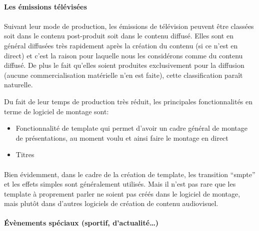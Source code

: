\paragraph {Les émissions télévisées}

\paragraph{}

Suivant leur mode de production, les émissions de télévision peuvent
être classées soit dans le contenu post-produit soit dans le contenu
diffusé. Elles sont en général diffusées très rapidement après la
création du contenu (si ce n'est en direct) et c'est la raison pour
laquelle nous les considérons comme du contenu diffusé. De plus le
fait qu'elles soient produites exclusivement pour la diffusion (aucune
commercialisation matérielle n'en est faite), cette classification
paraît naturelle.

Du fait de leur temps de production très réduit, les principales
fonctionnalités en terme de logiciel de montage sont:

\begin{itemize} \setlength{\itemsep}{2mm}

  \item{Fonctionnalité de template qui permet d'avoir un cadre général
    de montage de présentations, au moment voulu et ainsi faire le
    montage en direct}

  \item{Titres}

\end{itemize}

\paragraph{}

Bien évidemment, dans le cadre de la création de template,
les transition ``smpte'' et les effets simples sont
généralement utilisés. Mais il n'est pas rare que les template à
proprement parler ne soient pas créés dans le logiciel de montage,
mais plutôt dans d'autres logiciels de création de contenu audiovisuel.

\paragraph {Évènements spéciaux (sportif, d'actualité\ldots)}

\paragraph{}

